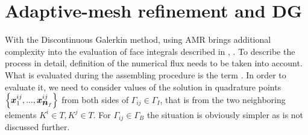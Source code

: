 \section{Adaptive-mesh refinement and DG}
With the Discontinuous Galerkin method, using AMR brings additional complexity into the evaluation of face integrals described in , .
To describe the process in detail, definition of the numerical flux  needs to be taken into account. What is evaluated during the assembling procedure  is the term . In order to evaluate it, we need to consider values of the solution in quadrature points $\left\{\mbox{\boldmath $x$}^{ij}_1, ..., \mbox{\boldmath $x$}^{ij}_{\mbox{\boldmath $n$}_f}\right\}$ from both sides of $\Gamma_{ij}\in \Gamma_I$, that is from the two neighboring elements $K^i\in T, K^j\in T$. For $\Gamma_{ij}\in \Gamma_B$ the situation is obviously simpler as is not discussed further.
